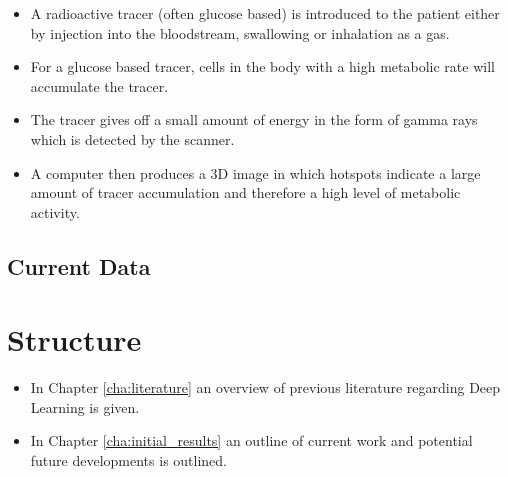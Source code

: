\begin{itemize}
    \item A radioactive tracer (often glucose based) is introduced to the patient either by injection into the bloodstream, swallowing or inhalation as a gas.
    \item For a glucose based tracer, cells in the body with a high metabolic rate will accumulate the tracer.
    \item The tracer gives off a small amount of energy in the form of gamma rays which is detected by the scanner.
    \item A computer then produces a 3D image in which hotspots indicate a large amount of tracer accumulation and therefore a high level of metabolic activity.
\end{itemize}


\subsection{Current Data}\label{subsec:current_data_intro}



\section{Structure}\label{sec:structure}

\begin{itemize}
    \item In Chapter \ref{cha:literature} an overview of previous literature regarding Deep Learning is given.
    \item In Chapter \ref{cha:initial_results} an outline of current work and potential future developments is outlined.
\end{itemize}